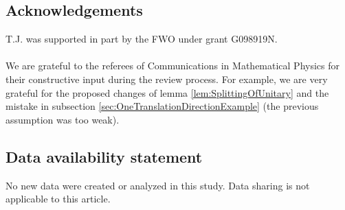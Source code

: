 \documentclass[11pt,a4paper,twoside]{article}
\numberwithin{equation}{section}
\begin{document}
\subsection*{Acknowledgements}
T.J. was supported in part by the FWO under grant G098919N.\\\\
We are grateful to the referees of Communications in Mathematical Physics for their constructive input during the review process. For example, we are very grateful for the proposed changes of lemma \ref{lem:SplittingOfUnitary} and the mistake in subsection \ref{sec:OneTranslationDirectionExample} (the previous assumption was too weak).
\subsection*{Data availability statement}
No new data were created or analyzed in this study. Data sharing is not applicable to this article.
\end{document}
